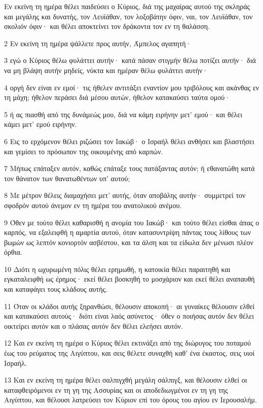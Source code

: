 \par Εν εκείνη τη ημέρα θέλει παιδεύσει ο Κύριος, διά της μαχαίρας αυτού της σκληράς και μεγάλης και δυνατής, τον Λευϊάθαν, τον λοξοβάτην όφιν, ναι, τον Λευϊάθαν, τον σκολιόν όφιν· και θέλει αποκτείνει τον δράκοντα τον εν τη θαλάσση.
\par 2 Εν εκείνη τη ημέρα ψάλλετε προς αυτήν, Άμπελος αγαπητή·
\par 3 εγώ ο Κύριος θέλω φυλάττει αυτήν· κατά πάσαν στιγμήν θέλω ποτίζει αυτήν· διά να μη βλάψη αυτήν μηδείς, νύκτα και ημέραν θέλω φυλάττει αυτήν·
\par 4 οργή δεν είναι εν εμοί· τις ήθελεν αντιτάξει εναντίον μου τριβόλους και ακάνθας εν τη μάχη; ήθελον περάσει διά μέσου αυτών, ήθελον κατακαύσει ταύτα ομού·
\par 5 ή ας πιασθή από της δυνάμεώς μου, διά να κάμη ειρήνην μετ' εμού· και θέλει κάμει μετ' εμού ειρήνην.
\par 6 Εις το ερχόμενον θέλει ριζώσει τον Ιακώβ· ο Ισραήλ θέλει ανθήσει και βλαστήσει και γεμίσει το πρόσωπον της οικουμένης από καρπών.
\par 7 Μήπως επάταξεν αυτόν, καθώς επάταξε τους πατάξαντας αυτόν; ή εθανατώθη κατά τον θάνατον των θανατωθέντων υπ' αυτού;
\par 8 Με μέτρον θέλεις διαμαχήσει μετ' αυτής, όταν αποβάλης αυτήν· συμμετρεί τον σφοδρόν αυτού άνεμον εν τη ημέρα του ανατολικού ανέμου.
\par 9 Όθεν με τούτο θέλει καθαρισθή η ανομία του Ιακώβ· και τούτο θέλει είσθαι άπας ο καρπός, να εξαλειφθή η αμαρτία αυτού, όταν κατασυντρίψη πάντας τους λίθους των βωμών ως λεπτόν κονιορτόν ασβέστου, και τα άλση και τα είδωλα δεν μένωσι πλέον όρθια.
\par 10 Διότι η ωχυρωμένη πόλις θέλει ερημωθή, η κατοικία θέλει παραιτηθή και εγκαταλειφθή ως έρημος· εκεί θέλει βοσκηθή το μοσχάριον και εκεί θέλει αναπαυθή και καταφάγει τους κλάδους αυτής.
\par 11 Όταν οι κλάδοι αυτής ξηρανθώσι, θέλουσιν αποκοπή· αι γυναίκες θέλουσιν ελθεί και κατακαύσει αυτούς· διότι είναι λαός ασύνετος· όθεν ο ποιήσας αυτόν δεν θέλει οικτείρει αυτόν και ο πλάσας αυτόν δεν θέλει ελεήσει αυτόν.
\par 12 Και εν εκείνη τη ημέρα ο Κύριος θέλει εκτινάξει από της διώρυγος του ποταμού έως του ρεύματος της Αιγύπτου, και σεις θέλετε συναχθή καθ' ένα έκαστος, σεις υιοί Ισραήλ.
\par 13 Και εν εκείνη τη ημέρα θέλει σαλπιγχθή μεγάλη σάλπιγξ, και θέλουσιν ελθεί οι καταφθειρόμενοι εν τη γη της Ασσυρίας και οι αποδεδιωγμένοι εν τη γη της Αιγύπτου, και θέλουσι λατρεύσει τον Κύριον επί του όρους του αγίου εν Ιερουσαλήμ.


